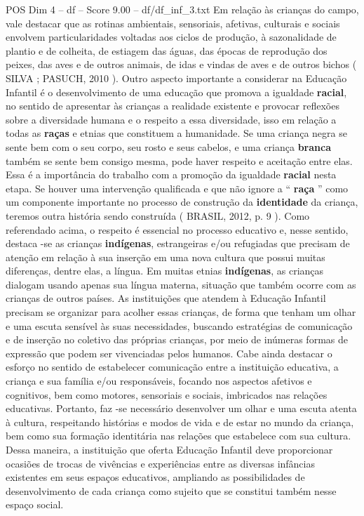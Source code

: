 \begin{textsample}{POS Dim 4 – df – Score 9.00 – df/df\_inf\_3.txt}
Em relação às crianças do campo, vale destacar que as rotinas ambientais, sensoriais, afetivas, culturais e sociais envolvem particularidades voltadas aos ciclos de produção, à sazonalidade de plantio e de colheita, de estiagem das águas, das épocas de reprodução dos peixes, das aves e de outros animais, de idas e vindas de aves e de outros bichos ( SILVA ; PASUCH, 2010 ).
Outro aspecto importante a considerar na Educação Infantil é o desenvolvimento de uma educação que promova a igualdade \textbf{racial}, no sentido de apresentar às crianças a realidade existente e provocar reflexões sobre a diversidade humana e o respeito a essa diversidade, isso em relação a todas as \textbf{raças} e etnias que constituem a humanidade.
Se uma criança negra se sente bem com o seu corpo, seu rosto e seus cabelos, e uma criança \textbf{branca} também se sente bem consigo mesma, pode haver respeito e aceitação entre elas.
Essa é a importância do trabalho com a promoção da igualdade \textbf{racial} nesta etapa.
Se houver uma intervenção qualificada e que não ignore a “ \textbf{raça} ” como um componente importante no processo de construção da \textbf{identidade} da criança, teremos outra história sendo construída ( BRASIL, 2012, p. 9 ).
Como referendado acima, o respeito é essencial no processo educativo e, nesse sentido, destaca -se as crianças \textbf{indígenas}, estrangeiras e/ou refugiadas que precisam de atenção em relação à sua inserção em uma nova cultura que possui muitas diferenças, dentre elas, a língua.
Em muitas etnias \textbf{indígenas}, as crianças dialogam usando apenas sua língua materna, situação que também ocorre com as crianças de outros países.
As instituições que atendem à Educação Infantil precisam se organizar para acolher essas crianças, de forma que tenham um olhar e uma escuta sensível às suas necessidades, buscando estratégias de comunicação e de inserção no coletivo das próprias crianças, por meio de inúmeras formas de expressão que podem ser vivenciadas pelos humanos.
Cabe ainda destacar o esforço no sentido de estabelecer comunicação entre a instituição educativa, a criança e sua família e/ou responsáveis, focando nos aspectos afetivos e cognitivos, bem como motores, sensoriais e sociais, imbricados nas relações educativas.
Portanto, faz -se necessário desenvolver um olhar e uma escuta atenta à cultura, respeitando histórias e modos de vida e de estar no mundo da criança, bem como sua formação identitária nas relações que estabelece com sua cultura.
Dessa maneira, a instituição que oferta Educação Infantil deve proporcionar ocasiões de trocas de vivências e experiências entre as diversas infâncias existentes em seus espaços educativos, ampliando as possibilidades de desenvolvimento de cada criança como sujeito que se constitui também nesse espaço social.

\end{textsample}
